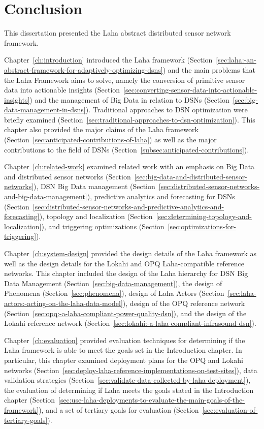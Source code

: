 \chapter{Conclusion}\label{ch:conclusion}

This dissertation presented the Laha abstract distributed sensor network framework.

Chapter~\ref{ch:introduction} introduced the Laha framework (Section~\ref{sec:laha:-an-abstract-framework-for-adaptively-optimizing-dsns}) and the main problems that the Laha Framework aims to solve, namely the conversion of primitive sensor data into actionable insights (Section~\ref{sec:converting-sensor-data-into-actionable-insights}) and the management of Big Data in relation to DSNs (Section~\ref{sec:big-data-management-in-dsns}). Traditional approaches to DSN optimization were briefly examined (Section~\ref{sec:traditional-approaches-to-dsn-optimization}). This chapter also provided the major claims of the Laha framework (Section~\ref{sec:anticipated-contributions-of-laha}) as well as the major contributions to the field of DSNs (Section~\ref{subsec:anticipated-contributions}).

Chapter~\ref{ch:related-work} examined related work with an emphasis on Big Data and distributed sensor networks (Section~\ref{sec:big-data-and-distributed-sensor-networks}), DSN Big Data management (Section~\ref{sec:distributed-sensor-networks-and-big-data-management}), predictive analytics and forecasting for DSNs (Section~\ref{sec:distributed-sensor-networks-and-predictive-analytics-and-forecasting}), topology and localization (Section~\ref{sec:determining-topology-and-localization}), and triggering optimizations (Section~\ref{sec:optimizations-for-triggering}).

Chapter~\ref{ch:system-design} provided the design details of the Laha framework as well as the design details for the Lokahi and OPQ Laha-compatible reference networks. This chapter included the design of the Laha hierarchy for DSN Big Data Management (Section~\ref{sec:big-data-management}), the design of Phenomena (Section~\ref{sec:phenomena}), design of Laha Actors (Section~\ref{sec:laha-actors:-acting-on-the-laha-data-model}), design of the OPQ reference network (Section~\ref{sec:opq:-a-laha-compliant-power-quality-dsn}), and the design of the Lokahi reference network (Section~\ref{sec:lokahi:-a-laha-compliant-infrasound-dsn}).

Chapter~\ref{ch:evaluation} provided evaluation techniques for determining if the Laha framework is able to meet the goals set in the Introduction chapter. In particular, this chapter examined deployment plans for the OPQ and Lokahi networks (Section~\ref{sec:deploy-laha-reference-implementations-on-test-sites}), data validation strategies (Section~\ref{sec:validate-data-collected-by-laha-deployment}), the evaluation of determining if Laha meets the goals stated in the Introduction chapter (Section~\ref{sec:use-laha-deployments-to-evaluate-the-main-goals-of-the-framework}), and a set of tertiary goals for evaluation (Section~\ref{sec:evaluation-of-tertiary-goals}).

